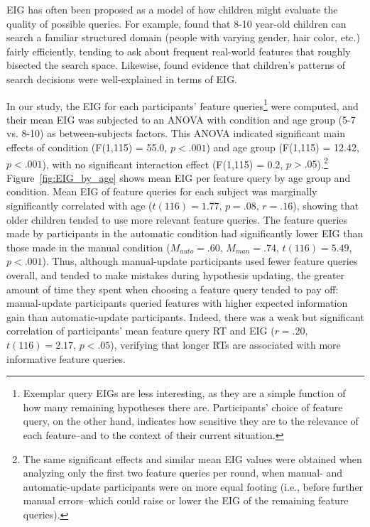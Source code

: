 \documentclass[man,floatsintext]{apa6}
\begin{document}
EIG has often been proposed as a model of how children might evaluate the quality of possible queries.  For example,  found that 8-10 year-old children can search a familiar structured domain (people with varying gender, hair color, etc.) fairly efficiently, tending to ask about frequent real-world features that roughly bisected the search space. 
 Likewise,  found evidence that children's patterns of search decisions were well-explained in terms of EIG.

In our study, the EIG for each participants' feature queries\footnote{Exemplar query EIGs are 
less interesting, as they are a simple function of how many remaining hypotheses 
there are. Participants' choice of feature query, on the other hand, indicates how 
sensitive they are to the relevance of each feature--and to the context of their 
current situation.} were computed, and their mean EIG was 
subjected to an ANOVA with condition and age group (5-7 vs. 8-10) as between-subjects factors. 
This ANOVA indicated significant main effects of condition (F(1,115) = 55.0, $p<.001$) 
and age group (F(1,115) = 12.42, $p<.001$), with no significant interaction effect (F(1,115) = 0.2, $p>.05$).\footnote{The same significant effects and similar mean EIG values were obtained when analyzing only the first two feature queries per round, when manual- and automatic-update participants were on more equal footing (i.e., before further manual errors--which could raise or lower the EIG of the remaining feature queries).}
Figure~\ref{fig:EIG_by_age} shows mean EIG per feature query by age group and condition. Mean 
EIG of feature queries for each subject was marginally significantly correlated with 
age ($t(116)=1.77$, $p=.08$, $r=.16$), showing that older children tended to use 
more relevant feature queries. The feature queries made by participants in the 
automatic condition had significantly lower EIG than those made in the manual 
condition ($M_{auto} = .60$, $M_{man} = .74$, $t(116) = 5.49$,  $p<.001$). Thus, 
although manual-update participants used fewer feature queries overall, and tended 
to make mistakes during hypothesis updating, the greater amount of time they spent 
when choosing a feature query tended to pay off: manual-update participants 
queried features with higher expected information gain than automatic-update 
participants. Indeed, there was a weak but significant correlation of participants' mean feature query RT and EIG ($r=.20$, $t(116)=2.17$, $p<.05$), verifying that longer RTs are associated with more informative feature queries.
\end{document}
